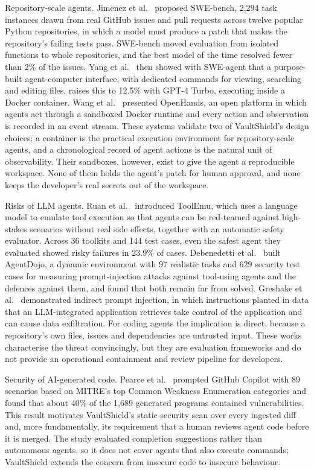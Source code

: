 \documentclass[12pt,a4paper,oneside]{report}
\begin{document}
Repository-scale agents. Jimenez et al.~\cite{ref2} proposed SWE-bench, 2,294 task instances drawn from real GitHub issues and pull requests across twelve popular Python repositories, in which a model must produce a patch that makes the repository's failing tests pass. SWE-bench moved evaluation from isolated functions to whole repositories, and the best model of the time resolved fewer than 2\% of the issues. Yang et al.~\cite{ref3} then showed with SWE-agent that a purpose-built agent-computer interface, with dedicated commands for viewing, searching and editing files, raises this to 12.5\% with GPT-4 Turbo, executing inside a Docker container. Wang et al.~\cite{ref4} presented OpenHands, an open platform in which agents act through a sandboxed Docker runtime and every action and observation is recorded in an event stream. These systems validate two of VaultShield's design choices: a container is the practical execution environment for repository-scale agents, and a chronological record of agent actions is the natural unit of observability. Their sandboxes, however, exist to give the agent a reproducible workspace. None of them holds the agent's patch for human approval, and none keeps the developer's real secrets out of the workspace.

Risks of LLM agents. Ruan et al.~\cite{ref5} introduced ToolEmu, which uses a language model to emulate tool execution so that agents can be red-teamed against high-stakes scenarios without real side effects, together with an automatic safety evaluator. Across 36 toolkits and 144 test cases, even the safest agent they evaluated showed risky failures in 23.9\% of cases. Debenedetti et al.~\cite{ref6} built AgentDojo, a dynamic environment with 97 realistic tasks and 629 security test cases for measuring prompt-injection attacks against tool-using agents and the defences against them, and found that both remain far from solved. Greshake et al.~\cite{ref7} demonstrated indirect prompt injection, in which instructions planted in data that an LLM-integrated application retrieves take control of the application and can cause data exfiltration. For coding agents the implication is direct, because a repository's own files, issues and dependencies are untrusted input. These works characterise the threat convincingly, but they are evaluation frameworks and do not provide an operational containment and review pipeline for developers.

Security of AI-generated code. Pearce et al.~\cite{ref8} prompted GitHub Copilot with 89 scenarios based on MITRE's top Common Weakness Enumeration categories and found that about 40\% of the 1,689 generated programs contained vulnerabilities. This result motivates VaultShield's static security scan over every ingested diff and, more fundamentally, its requirement that a human reviews agent code before it is merged. The study evaluated completion suggestions rather than autonomous agents, so it does not cover agents that also execute commands; VaultShield extends the concern from insecure code to insecure behaviour.
\end{document}
